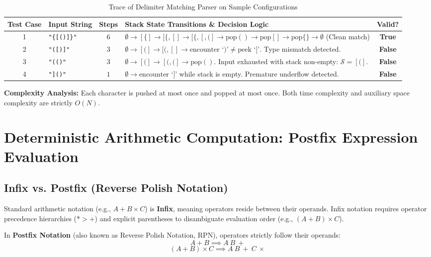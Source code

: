 \documentclass[10pt,journal,compsoc,onecolumn]{IEEEtran}
\begin{document}
\begin{table}[h]
\centering
\caption{Trace of Delimiter Matching Parser on Sample Configurations}
\label{tab:parentheses_trace}
\begin{tabular}{@{}clcp{7.0cm}c@{}}
\toprule
\textbf{Test Case} & \textbf{Input String} & \textbf{Steps} & \textbf{Stack State Transitions \& Decision Logic} & \textbf{Valid?} \\ \midrule
1 & \texttt{"\{[()]\}"} & $6$ & $\emptyset \to [\{] \to [\{, [] \to [\{, [, (] \to \text{pop}() \to \text{pop}[] \to \text{pop}\{\} \to \emptyset$ (Clean match) & \textbf{True} \\
2 & \texttt{"([)]"} & $3$ & $\emptyset \to [(] \to [(, [] \to \text{encounter `)'} \ne \text{peek `['}$. Type mismatch detected. & \textbf{False} \\
3 & \texttt{"(()"} & $3$ & $\emptyset \to [(] \to [(, (] \to \text{pop}()$. Input exhausted with stack non-empty: $\mathcal{S} = [(]$. & \textbf{False} \\
4 & \texttt{"]()"} & $1$ & $\emptyset \to \text{encounter `]'}$ while stack is empty. Premature underflow detected. & \textbf{False} \\ \bottomrule
\end{tabular}
\end{table}

\textbf{Complexity Analysis:} Each character is pushed at most once and popped at most once. Both time complexity and auxiliary space complexity are strictly $O(N)$.

\section{Deterministic Arithmetic Computation: Postfix Expression Evaluation}
\label{sec:postfix}

\subsection{Infix vs. Postfix (Reverse Polish Notation)}

Standard arithmetic notation (e.g., $A + B \times C$) is \textbf{Infix}, meaning operators reside between their operands. Infix notation requires operator precedence hierarchies ($* > +$) and explicit parentheses to disambiguate evaluation order (e.g., $(A + B) \times C$).

In \textbf{Postfix Notation} (also known as Reverse Polish Notation, RPN), operators strictly follow their operands:
\[
A + B \implies A \ B \ +
\]
\[
(A + B) \times C \implies A \ B \ + \ C \ \times
\]
\end{document}
